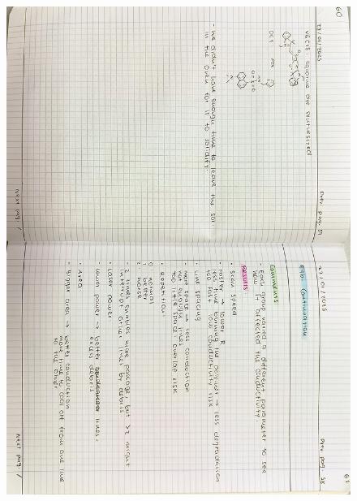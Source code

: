 \begin{figure}[H]
	\centering
	\includegraphics[width=0.6\linewidth, angle=90]{../images/compressed/IMG20250123173229.jpg}
\end{figure}
